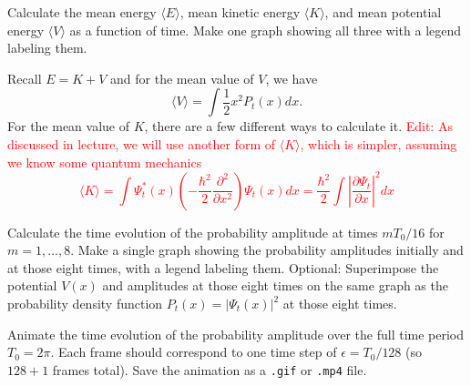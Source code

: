 \begin{solution}
\end{solution}

\begin{problem}[10]
Calculate the mean energy $\langle E \rangle$, mean kinetic energy $\langle K \rangle$, and mean potential energy $\langle V \rangle$ as a function of time.
Make one graph showing all three with a legend labeling them.

\begin{hint}
  Recall $E = K + V$ and for the mean value of $V$, we have
  \begin{equation}
    \langle V\rangle = \int \frac{1}{2}x^2 P_t(x) dx.
  \end{equation}
  For the mean value of $K$, there are a few different ways to calculate it.
  \textcolor{red}{
    Edit: As discussed in lecture, we will use another form of $\langle K\rangle$, which is simpler, assuming we know some quantum mechanics
    \begin{equation}
      \langle K\rangle = \int \Psi_t^\ast(x) \left(- \frac{\hbar^2}{2} \frac{\partial^2}{\partial x^2}\right) \Psi_t(x) dx = \frac{\hbar^2}{2} \int \left|\frac{\partial\Psi_t}{\partial x}\right|^2  dx
    \end{equation}
  }
\end{hint}
\end{problem}

\begin{solution}
\end{solution}

\begin{problem}[10]
Calculate the time evolution of the probability amplitude at times $mT_0/16$ for $m=1, \dots, 8$.
Make a single graph showing the probability amplitudes initially and at those eight times, with a legend labeling them.
Optional: Superimpose the potential $V(x)$ and amplitudes at those eight times on the same graph as the probability density function $P_t(x) = |\Psi_t(x)|^2$ at those eight times.
\end{problem}

\begin{solution}
\end{solution}

\begin{problem}[10]
Animate the time evolution of the probability amplitude over the full time period $T_0 = 2\pi$.
Each frame should correspond to one time step of $\epsilon = T_0/128$ (so $128+1$ frames total).
Save the animation as a \texttt{.gif} or \texttt{.mp4} file.
\end{problem}

\begin{solution}
\end{solution}


